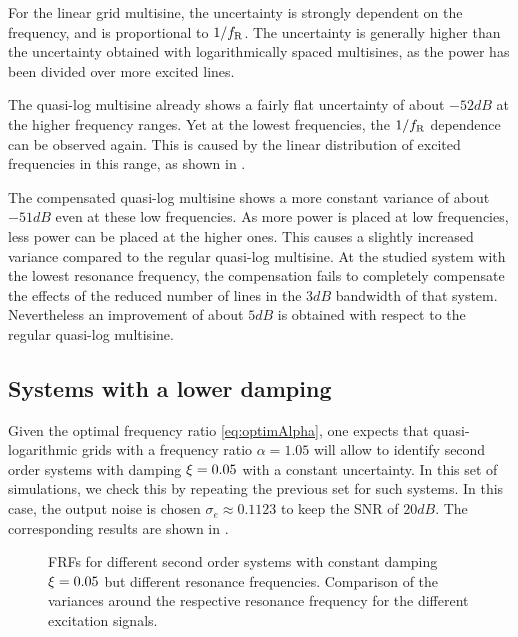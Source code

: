   For the linear grid multisine, the uncertainty is strongly dependent on the frequency, and is proportional to $1/f_{\mathrm{R}}$.
  The uncertainty is generally higher than the uncertainty obtained with logarithmically spaced multisines, as the power has been divided over more excited lines.

  The quasi-log multisine already shows a fairly flat uncertainty of about $-52 \unit{dB}$ at the higher frequency ranges.
  Yet at the lowest frequencies, the $1/f_{\mathrm{R}}$ dependence can be observed again.
  This is caused by the linear distribution of excited frequencies in this range, as shown in .

  The compensated quasi-log multisine shows a more constant variance of about $-51 \unit{dB}$ even at these low frequencies.
  As more power is placed at low frequencies, less power can be placed at the higher ones.
  This causes a slightly increased variance compared to the regular quasi-log multisine.
  At the studied system with the lowest resonance frequency, the compensation fails to completely compensate the effects of the reduced number of lines in the $3\unit{dB}$ bandwidth of that system.
  Nevertheless an improvement of about $5\unit{dB}$ is obtained with respect to the regular quasi-log multisine.

  \subsection{Systems with a lower damping}
  Given the optimal frequency ratio \eqref{eq:optimAlpha}, one expects that quasi-logarithmic grids with a frequency ratio $\alpha = 1.05$ will allow to identify second order systems with damping $\damping = 0.05$ with a constant uncertainty.
  In this set of simulations, we check this by repeating the previous set for such systems.
  In this case, the output noise is chosen $\sigma_e \approx 0.1123$ to keep the SNR of $20\unit{dB}$.
  The corresponding results are shown in .
 
  \begin{figure}%
    \centering
    \setlength\figureheight{5cm}
    \setlength{}
    
    \caption[Simulated FRFs and their variances of systems with $\damping=0.05$ for different excitation signals.]{FRFs for different second order systems with constant damping
             $\damping=0.05$ but different resonance frequencies. Comparison of the
             variances around the respective resonance frequency for the different
             excitation signals.}%
    \label{fig:damping005}
  \end{figure}

